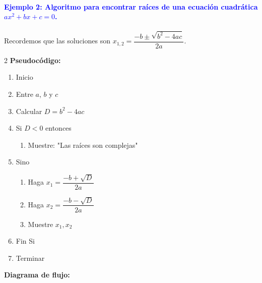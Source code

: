 \documentclass[12pt]{article}
\begin{document}
\paragraph{\textcolor{blue}{Ejemplo 2: Algoritmo para encontrar raíces de una ecuación 
cuadrática $ax^2 + bx + c = 0$.}}
Recordemos que las soluciones son  $x_{1,2} = \dfrac{-b \pm \sqrt{b^2 - 4ac}}{2a}$.

\begin{multicols}{2}
\noindent \textbf{Pseudocódigo:}
\begin{enumerate}[label=\arabic*)]
    \item Inicio
    \item Entre $a$, $b$ y $c$
    \item Calcular $D = b^2 - 4ac$
    \item Si $D < 0$ entonces
    \begin{enumerate}[label=\alph*)]
        \item Muestre: "Las raíces son complejas"
    \end{enumerate}
    \item Sino
    \begin{enumerate}[label=\alph*)]
        \item Haga $x_1 = \dfrac{-b + \sqrt{D}}{2a}$
        \item Haga $x_2 = \dfrac{-b - \sqrt{D}}{2a}$
        \item Muestre $x_1, x_2$
    \end{enumerate}
    \item Fin Si
    \item Terminar
\end{enumerate}

\columnbreak

\noindent \textbf{Diagrama de flujo:}

\begin{center}
\end{center}
\end{multicols}
\end{document}

